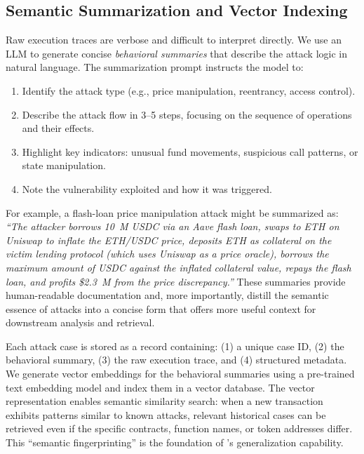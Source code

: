 \subsection{Semantic Summarization and Vector Indexing}

Raw execution traces are verbose and difficult to interpret directly. We use an LLM to generate concise \textit{behavioral summaries} that describe the attack logic in natural language. The summarization prompt instructs the model to:

\begin{enumerate}
    \item Identify the attack type (e.g., price manipulation, reentrancy, access control).
    \item Describe the attack flow in 3--5 steps, focusing on the sequence of operations and their effects.
    \item Highlight key indicators: unusual fund movements, suspicious call patterns, or state manipulation.
    \item Note the vulnerability exploited and how it was triggered.
\end{enumerate}

For example, a flash-loan price manipulation attack might be summarized as: \textit{``The attacker borrows 10~M USDC via an Aave flash loan, swaps to ETH on Uniswap to inflate the ETH/USDC price, deposits ETH as collateral on the victim lending protocol (which uses Uniswap as a price oracle), borrows the maximum amount of USDC against the inflated collateral value, repays the flash loan, and profits \$2.3~M from the price discrepancy.''}
These summaries provide human-readable documentation and, more importantly, distill the semantic essence of attacks into a concise form that offers more useful context for downstream analysis and retrieval.


Each attack case is stored as a record containing: (1) a unique case ID, (2) the behavioral summary, (3) the raw execution trace, and (4) structured metadata. We generate vector embeddings for the behavioral summaries using a pre-trained text embedding model and index them in a vector database.
The vector representation enables semantic similarity search: when a new transaction exhibits patterns similar to known attacks, relevant historical cases can be retrieved even if the specific contracts, function names, or token addresses differ. This ``semantic fingerprinting'' is the foundation of \approach's generalization capability.

